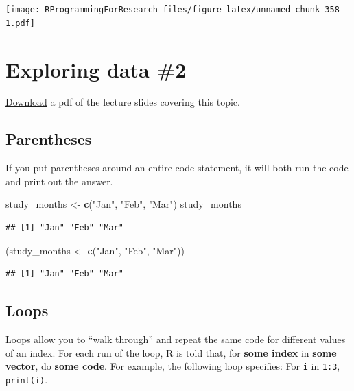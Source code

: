 \documentclass[]{book}
\makeatletter
\newenvironment{Shaded}{\begin{snugshade}}{\end{snugshade}}
\newcommand{\KeywordTok}[1]{\textcolor[rgb]{0.13,0.29,0.53}{\textbf{#1}}}
\newcommand{\StringTok}[1]{\textcolor[rgb]{0.31,0.60,0.02}{#1}}
\newcommand{\NormalTok}[1]{#1}
\newenvironment{kframe}{%
\medskip{}
\setlength{\fboxsep}{.8em}
 \def\at@end@of@kframe{}%
 \ifinner\ifhmode%
  \def\at@end@of@kframe{\end{minipage}}%
  \begin{minipage}{\columnwidth}%
 \fi\fi%
 \def\FrameCommand##1{\hskip\@totalleftmargin \hskip-\fboxsep
 \colorbox{shadecolor}{##1}\hskip-\fboxsep
     \hskip-\linewidth \hskip-\@totalleftmargin \hskip\columnwidth}%
 \MakeFramed {\advance\hsize-\width
   \@totalleftmargin\z@ \linewidth\hsize
   \@setminipage}}%
 {\par\unskip\endMakeFramed%
 \at@end@of@kframe}
\renewenvironment{Shaded}{\begin{kframe}}{\end{kframe}}
\theoremstyle{definition}
\theoremstyle{definition}
\theoremstyle{definition}
\theoremstyle{remark}
\makeatother
\begin{document}
\texttt{[image: RProgrammingForResearch\_files/figure-latex/unnamed-chunk-358-1.pdf]}

\chapter{Exploring data \#2}\label{exploring-data-2}

\href{https://github.com/geanders/RProgrammingForResearch/raw/master/slides/CourseNotes_Week7.pdf}{Download}
a pdf of the lecture slides covering this topic.

\section{Parentheses}\label{parentheses}

If you put parentheses around an entire code statement, it will both run
the code and print out the answer.

\begin{Shaded}
\begin{Highlighting}[]
\NormalTok{study_months <-}\StringTok{ }\KeywordTok{c}\NormalTok{(}\StringTok{"Jan"}\NormalTok{, }\StringTok{"Feb"}\NormalTok{, }\StringTok{"Mar"}\NormalTok{)}
\NormalTok{study_months}
\end{Highlighting}
\end{Shaded}

\begin{verbatim}
## [1] "Jan" "Feb" "Mar"
\end{verbatim}

\begin{Shaded}
\begin{Highlighting}[]
\NormalTok{(study_months <-}\StringTok{ }\KeywordTok{c}\NormalTok{(}\StringTok{"Jan"}\NormalTok{, }\StringTok{"Feb"}\NormalTok{, }\StringTok{"Mar"}\NormalTok{))}
\end{Highlighting}
\end{Shaded}

\begin{verbatim}
## [1] "Jan" "Feb" "Mar"
\end{verbatim}

\section{Loops}\label{loops}

Loops allow you to ``walk through'' and repeat the same code for
different values of an index. For each run of the loop, R is told that,
for \textbf{some index} in \textbf{some vector}, do \textbf{some code}.
For example, the following loop specifies: For \texttt{i} in
\texttt{1:3}, \texttt{print(i)}.
\end{document}
